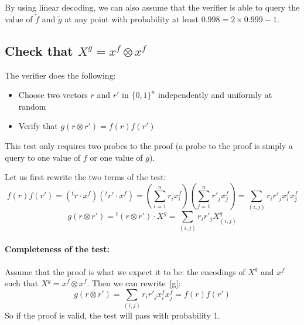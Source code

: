 \documentclass[a4paper,10pt]{article}
\theoremstyle{remark}
\begin{document}
By using linear decoding, we can also assume that the verifier is able to query
the value of $\tilde{f}$ and $\tilde{g}$ at any point with probability at least
$0.998=2 \times 0.999 -1$.

\subsection{Check that $X^g = x^f\otimes x^f$}

The verifier does the following: 
\begin{itemize}
\item Choose two vectors $r$ and $r'$ in $\{0,1\}^n$ independently and
uniformly at random
\item Verify that $g(r\otimes r') = f(r)f(r')$ 
\end{itemize}
This test only requires two probes to the proof (a probe to the proof is
simply a query to one value of $f$ or one value of $g$).

Let us first rewrite the two terms of the test:
\begin{equation}\label{f}
f(r)f(r') = \left({}^tr\cdot x^f\right)\left({}^tr'\cdot x^f\right) 
= \left(\sum_{i=1}^n r_ix^f_i\right) \left(\sum_{j=1}^n r'_jx^f_j\right)
= \sum_{(i,j)} r_ir'_jx^f_ix^f_j
\end{equation}
\begin{equation}\label{g}
g(r\otimes r') = {}^t(r\otimes r')\cdot X^g=\sum_{(i,j)}r_ir'_jX^g_{(i,j)}
\end{equation}

\paragraph{Completeness of the test:} Assume that the proof is what we expect it
to be: the encodings of $X^g$ and $x^f$ such that $X^g = x^f\otimes x^f$. Then
we can rewrite~\eqref{g}:
\begin{displaymath}
g(r\otimes r') = \sum_{(i,j)}r_ir'_jx^f_ix^f_j = f(r)f(r')
\end{displaymath}
So if the proof is valid, the test will pass with probability 1.
\end{document}

